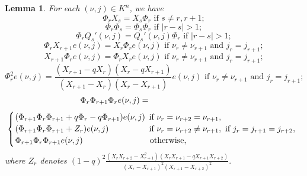 \documentclass[11pt, reqno]{amsart} \textwidth=14.9cm \oddsidemargin=1cm \evensidemargin=1cm
\newtheorem{lemma}[theorem]{Lemma}
\theoremstyle{definition}
\numberwithin{equation}{section}
\begin{document}
\begin{lemma}
For each $(\nu, j)\in K^{n}$, we have
\begin{equation}
\Phi_{r}X_{s}=X_{s}\Phi_{r}\text{ if } s\neq r, r+1;\label{phi-x}
\end{equation}
\begin{equation}
\Phi_{r}\Phi_{s}=\Phi_{s}\Phi_{r}\text{ if } \vert r-s\vert> 1;\label{phi-phi}
\end{equation}
\begin{equation}
\Phi_{r}Q_{s}'(\nu, j)=Q_{s}'(\nu, j)\Phi_{r}\text{ if } \vert r-s\vert> 1;\label{phi-q}
\end{equation}
\begin{equation}
\Phi_{r}X_{r+1}e(\nu, j)=X_{r}\Phi_{r}e(\nu, j)\text{ if } \nu_{r}\neq \nu_{r+1}\text{ and } j_{r}=j_{r+1};\label{phi-x-nuj1}
\end{equation}
\begin{equation}
X_{r+1}\Phi_{r}e(\nu, j)=\Phi_{r}X_{r}e(\nu, j)\text{ if } \nu_{r}\neq \nu_{r+1}\text{ and } j_{r}=j_{r+1};\label{phi-x-nuj2}
\end{equation}
\begin{equation}
\Phi_r^2e(\nu, j)=
\frac{(X_{r+1}-qX_r)(X_r-qX_{r+1})}{(X_{r+1}-X_{r})(X_{r}-X_{r+1})}e(\nu, j)\text{ if } \nu_{r}\neq \nu_{r+1}\text{ and } j_{r}=j_{r+1};\label{phi-2-nuj1}
\end{equation}
\begin{align*}
\hspace{-3cm}\Phi_r\Phi_{r+1}\Phi_re(\nu, j)=&\end{align*}
\begin{align}\left\{
\begin{array}{ll}
\hspace{-0.15cm}(\Phi_{r+1}\Phi_r\Phi_{r+1}+q\Phi_{r}-q\Phi_{r+1})e(\nu, j)&\hspace{-0.3cm}\text{ if } \nu_r=\nu_{r+2}=\nu_{r+1},\\[0.2em]
\hspace{-0.15cm}(\Phi_{r+1}\Phi_r\Phi_{r+1}+Z_r)e(\nu, j)&\hspace{-0.3cm}\text{ if } \nu_r=\nu_{r+2}\neq \nu_{r+1},~~~~\text{if } j_r=j_{r+1}=j_{r+2},\\[0.2em]\label{phi-braid}
\hspace{-0.15cm}\Phi_{r+1}\Phi_r\Phi_{r+1}e(\nu, j)&\hspace{-0.15cm}\text{otherwise,}
\end{array}
\right.
\end{align}
where $Z_r$ denotes $(1-q)^2\frac{(X_rX_{r+2}-X_{r+1}^2)(X_r X_{r+1}-qX_{r+1}X_{r+2})}{(X_r-X_{r+1})^2(X_{r+1}-X_{r+2})^2}.$
\end{lemma}
\end{document}
